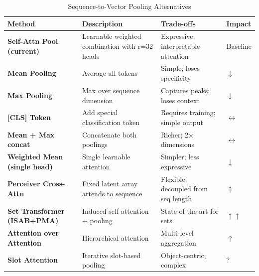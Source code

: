 \documentclass[11pt,a4paper]{article}
\begin{document}
\begin{longtable}{L{3cm}L{4cm}L{4cm}C{1.5cm}}
\caption{Sequence-to-Vector Pooling Alternatives} \\
\toprule
\textbf{Method} & \textbf{Description} & \textbf{Trade-offs} & \textbf{Impact} \\
\midrule
\endfirsthead
\bottomrule
\endlastfoot

\textbf{Self-Attn Pool (current)} & Learnable weighted combination with r=32 heads & Expressive; interpretable attention & Baseline \\

\textbf{Mean Pooling} & Average all tokens & Simple; loses specificity & \textcolor{negative}{$\downarrow$} \\

\textbf{Max Pooling} & Max over sequence dimension & Captures peaks; loses context & \textcolor{negative}{$\downarrow$} \\

\textbf{[CLS] Token} & Add special classification token & Requires training; simple output & \textcolor{neutral}{$\leftrightarrow$} \\

\textbf{Mean + Max concat} & Concatenate both poolings & Richer; 2$\times$ dimensions & \textcolor{neutral}{$\leftrightarrow$} \\

\textbf{Weighted Mean (single head)} & Single learnable attention & Simpler; less expressive & \textcolor{negative}{$\downarrow$} \\

\textbf{Perceiver Cross-Attn} & Fixed latent array attends to sequence & Flexible; decoupled from seq length & \textcolor{positive}{$\uparrow$} \\

\textbf{Set Transformer (ISAB+PMA)} & Induced self-attention + pooling & State-of-the-art for sets & \textcolor{positive}{$\uparrow\uparrow$} \\

\textbf{Attention over Attention} & Hierarchical attention & Multi-level aggregation & \textcolor{positive}{$\uparrow$} \\

\textbf{Slot Attention} & Iterative slot-based pooling & Object-centric; complex & \textcolor{uncertain}{$?$} \\

\end{longtable}
\end{document}
